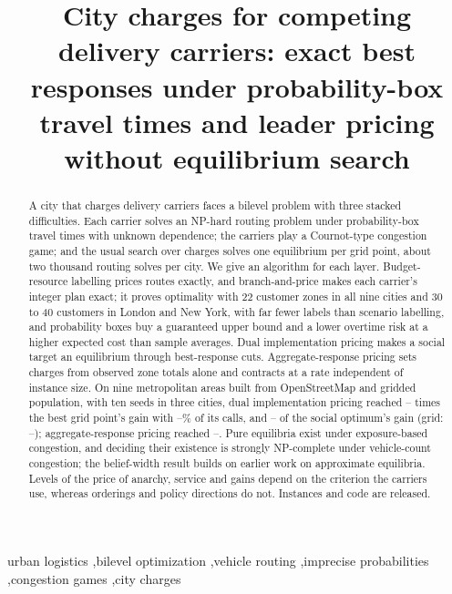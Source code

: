 \begin{frontmatter}
\date{}

\title{City charges for competing delivery carriers: exact best responses under probability-box travel times and leader pricing without equilibrium search}


\begin{abstract}
A city that charges delivery carriers faces a bilevel problem with three stacked difficulties. Each carrier solves an NP-hard routing problem under probability-box travel times with unknown dependence; the carriers play a Cournot-type congestion game; and the usual search over charges solves one equilibrium per grid point, about two thousand routing solves per city. We give an algorithm for each layer. Budget-resource labelling prices routes exactly, and branch-and-price makes each carrier's integer plan exact; it proves optimality with 22 customer zones in all nine cities and 30 to 40 customers in London and New York, with far fewer labels than scenario labelling, and probability boxes buy a guaranteed upper bound and a lower overtime risk at a higher expected cost than sample averages. Dual implementation pricing makes a social target an equilibrium through best-response cuts. Aggregate-response pricing sets charges from observed zone totals alone and contracts at a rate independent of instance size. On nine metropolitan areas built from OpenStreetMap and gridded population, with ten seeds in three cities, dual implementation pricing reached \TenDipGridBuenosAires--\TenDipGridNewDelhi{} times the best grid point's gain with \TenDipCallsNewDelhi--\TenDipCallsLondon\% of its calls, and \TenSoDipNewDelhi--\TenSoDipLondon{} of the social optimum's gain (grid: \TenSoGridNewDelhi--\TenSoGridBuenosAires); aggregate-response pricing reached \TenSoArpNewDelhi--\TenSoArpBuenosAires. Pure equilibria exist under exposure-based congestion, and deciding their existence is strongly NP-complete under vehicle-count congestion; the belief-width result builds on earlier work on approximate equilibria. Levels of the price of anarchy, service and gains depend on the criterion the carriers use, whereas orderings and policy directions do not. Instances and code are released.
\end{abstract}

\begin{keyword}
urban logistics \sep bilevel optimization \sep vehicle routing \sep imprecise probabilities \sep congestion games \sep city charges
\end{keyword}

\end{frontmatter}
